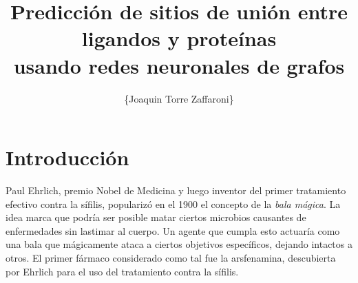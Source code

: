 \documentclass[
    left=2.0cm,         %
    right=2.0cm,        %
    top=2.0cm,          %
    bottom=2.5cm,         %
    bindingoffset=6mm,  %
    nohyphenation=false %
]{eiti/eiti-thesis}
\begin{document}
\EngineerThesis %
{}
\title{
    Predicción de sitios de unión entre ligandos y proteínas \\
    usando redes neuronales de grafos
}
\author{\{Joaquin Torre Zaffaroni\}}
\date{\the\year}
\maketitle




\tableofcontents
\newpage


\section{Introducción}



Paul Ehrlich, premio Nobel de Medicina y luego inventor del primer tratamiento 
efectivo contra la sífilis, popularizó en el 1900 el concepto de la \textit{bala mágica}.
La idea marca que podría ser posible matar ciertos microbios causantes de enfermedades
sin lastimar al cuerpo. Un agente que cumpla esto actuaría como una bala que mágicamente
ataca a ciertos objetivos específicos, dejando intactos a otros. El primer fármaco
considerado como tal fue la arsfenamina, descubierta por Ehrlich para el uso del
tratamiento contra la sífilis. 
\end{document}
